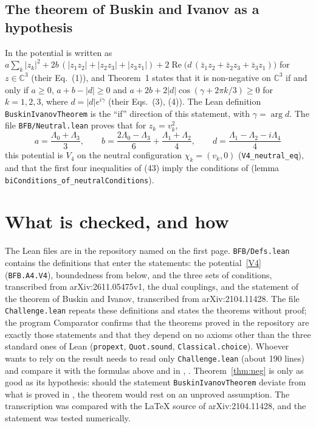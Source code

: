 \documentclass[11pt,a4paper]{amsart}
\theoremstyle{remark}
\newcommand{\C}{\mathbb{C}}
\newcommand{\La}{\Lambda}
\newcommand{\lean}[1]{\texttt{#1}}
\renewcommand{\Re}{\operatorname{Re}}
\begin{document}
\subsection{The theorem of Buskin and Ivanov as a hypothesis}
In \cite{BI} the potential is written as
$a\sum_k|z_k|^2+2b\,(|z_1z_2|+|z_2z_3|+|z_3z_1|)+2\Re\bigl(d\,(\bar z_1z_2+\bar z_2z_3+\bar z_3z_1)\bigr)$ for
$z\in\C^3$ (their Eq.~(1)), and Theorem~1 states that it is non-negative on $\C^3$ if and only if $a\ge0$,
$a+b-|d|\ge0$ and $a+2b+2|d|\cos(\gamma+2\pi k/3)\ge0$ for $k=1,2,3$, where $d=|d|e^{i\gamma}$ (their Eqs.~(3), (4)).
The Lean definition \lean{BuskinIvanovTheorem} is the ``if'' direction of this statement, with $\gamma=\arg d$. The
file \lean{BFB/Neutral.lean} proves that for $z_k=v_k^2$,
\[
a=\frac{\La_0+\La_3}{3},\qquad b=\frac{2\La_0-\La_3}{6}+\frac{\La_1+\La_2}{4},\qquad d=\frac{\La_1-\La_2-i\La_4}{4}
\]
this potential is $V_4$ on the neutral configuration $\chi_k=(v_k,0)$ (\lean{V4\_neutral\_eq}), and that the
first four inequalities of (43) imply the conditions of \cite{BI}
(lemma \lean{biConditions\_of\_neutralConditions}).

\section{What is checked, and how}

The Lean files are in the repository named on the first page. \lean{BFB/Defs.lean} contains the definitions that
enter the statements: the potential~\eqref{V4} (\lean{BFB.A4.V4}), boundedness from below, and the three sets of
conditions, transcribed from arXiv:2611.05475v1, the dual couplings, and the statement of the theorem of
Buskin and Ivanov, transcribed from arXiv:2104.11428. The file \lean{Challenge.lean} repeats these definitions and
states the theorems without proof; the program Comparator confirms that the theorems proved in the repository
are exactly those statements and that they depend on no axioms other than the three standard ones of Lean
(\lean{propext}, \lean{Quot.sound}, \lean{Classical.choice}). Whoever wants to rely on the result needs to
read only \lean{Challenge.lean} (about 190 lines) and compare it with the formulas above and in \cite{LM}, \cite{BI}.
Theorem~\ref{thm:neg} is only as good as its hypothesis: should the statement \lean{BuskinIvanovTheorem} deviate
from what is proved in \cite{BI}, the theorem would rest on an unproved assumption. The transcription was
compared with the \LaTeX{} source of arXiv:2104.11428, and the statement was tested numerically.
\end{document}

